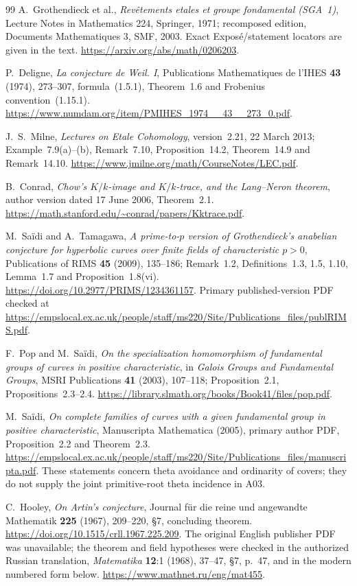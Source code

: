 \begin{thebibliography}{99}
A.~Grothendieck et al., \emph{Rev\^etements etales et groupe fondamental
(SGA~1)}, Lecture Notes in Mathematics 224, Springer, 1971;
recomposed edition, Documents Mathematiques 3, SMF, 2003.
Exact Expos\'e/statement locators are given in the text.
\url{https://arxiv.org/abs/math/0206203}.

P.~Deligne, \emph{La conjecture de Weil. I}, Publications
Mathematiques de l'IHES \textbf{43} (1974), 273--307,
formula~(1.5.1), Theorem~1.6 and Frobenius convention~(1.15.1).
\url{https://www.numdam.org/item/PMIHES_1974__43__273_0.pdf}.

J.~S.~Milne, \emph{Lectures on Etale Cohomology}, version~2.21,
22 March 2013; Example~7.9(a)--(b), Remark~7.10,
Proposition~14.2, Theorem~14.9 and Remark~14.10.
\url{https://www.jmilne.org/math/CourseNotes/LEC.pdf}.

B.~Conrad, \emph{Chow's $K/k$-image and $K/k$-trace, and the
Lang--Neron theorem}, author version dated 17 June 2006,
Theorem~2.1. \url{https://math.stanford.edu/~conrad/papers/Kktrace.pdf}.

M.~Sa\"idi and A.~Tamagawa, \emph{A prime-to-$p$ version of
Grothendieck's anabelian conjecture for hyperbolic curves over finite
fields of characteristic $p>0$}, Publications of RIMS
\textbf{45} (2009), 135--186; Remark~1.2,
Definitions~1.3, 1.5, 1.10, Lemma~1.7 and Proposition~1.8(vi).
\url{https://doi.org/10.2977/PRIMS/1234361157}.
Primary published-version PDF checked at
\url{https://empslocal.ex.ac.uk/people/staff/ms220/Site/Publications_files/publRIMS.pdf}.

F.~Pop and M.~Sa\"idi, \emph{On the specialization homomorphism
of fundamental groups of curves in positive characteristic},
in \emph{Galois Groups and Fundamental Groups}, MSRI Publications
\textbf{41} (2003), 107--118; Proposition~2.1,
Propositions~2.3--2.4.
\url{https://library.slmath.org/books/Book41/files/pop.pdf}.

M.~Sa\"idi, \emph{On complete families of curves with a given
fundamental group in positive characteristic}, Manuscripta
Mathematica (2005), primary author PDF, Proposition~2.2 and
Theorem~2.3. \url{https://empslocal.ex.ac.uk/people/staff/ms220/Site/Publications_files/manuscripta.pdf}.
These statements concern theta avoidance and ordinarity of covers;
they do not supply the joint primitive-root theta incidence in A03.

C.~Hooley, \emph{On Artin's conjecture}, Journal f\"ur die reine
und angewandte Mathematik \textbf{225} (1967), 209--220,
\S7, concluding theorem.
\url{https://doi.org/10.1515/crll.1967.225.209}.
The original English publisher PDF was unavailable; the theorem and
field hypotheses were checked in the authorized Russian translation,
\emph{Matematika} \textbf{12}:1 (1968), 37--47,
\S7, p.~47, and in the modern numbered form below.
\url{https://www.mathnet.ru/eng/mat455}.


\end{thebibliography}
